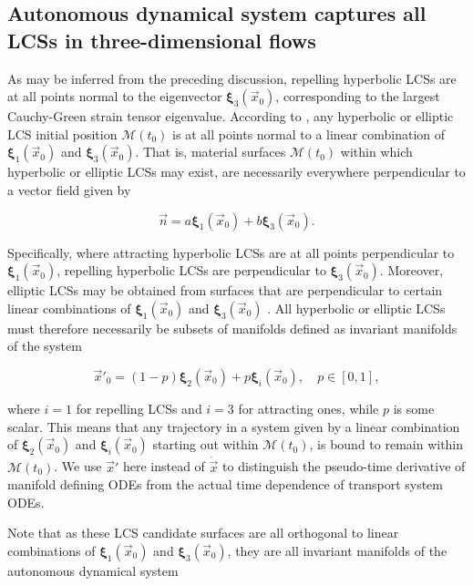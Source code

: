 \subsection{Autonomous dynamical system captures all LCSs in three-dimensional flows}\label{sec:Oettinger}

As may be inferred from the preceding discussion, repelling hyperbolic LCSs are at all points normal to the eigenvector $\bm{\xi}_3(\vec{x}_0)$, corresponding to the largest Cauchy-Green strain tensor eigenvalue. According to \cite{Oettinger}, any hyperbolic or elliptic LCS initial position $\mathcal{M}(t_0)$ is at all points normal to a linear combination of $\bm{\xi}_1(\vec{x}_0)$ and $\bm{\xi}_3(\vec{x}_0)$. That is, material surfaces $\mathcal{M}(t_0)$ within which hyperbolic or elliptic LCSs may exist, are necessarily everywhere perpendicular to a vector field given by

\begin{equation}\label{eq:normal_field}
\vec{n} = a\bm{\xi}_1(\vec{x}_0) + b\bm{\xi}_3(\vec{x}_0).
\end{equation}

\noindent Specifically, where attracting hyperbolic LCSs are at all points perpendicular to $\bm{\xi}_1(\vec{x}_0)$, repelling hyperbolic LCSs are perpendicular to $\bm{\xi}_3(\vec{x}_0)$. Moreover, elliptic LCSs may be obtained from surfaces that are perpendicular to certain linear combinations of $\bm{\xi}_1(\vec{x}_0)$ and $\bm{\xi}_3(\vec{x}_0)$ \citep{Oettinger}. All hyperbolic or elliptic LCSs must therefore necessarily be subsets of manifolds defined as invariant manifolds of the system

\begin{equation}\label{eq:hyperbolic_autonomous_dynamical_system}
\vec{x}'_0=(1-p)\bm{\xi}_2(\vec{x}_0) + p\bm{\xi}_i(\vec{x}_0),\quad p\in[0,1],
\end{equation}

\noindent where $i=1$ for repelling LCSs and $i=3$ for attracting ones, while $p$ is some scalar. This means that any trajectory in a system given by a linear combination of $\bm{\xi}_2(\vec{x}_0)$ and $\bm{\xi}_i(\vec{x}_0)$ starting out within $\mathcal{M}(t_0)$, is bound to remain within $\mathcal{M}(t_0)$. We use $\vec{x}'$ here instead of $\dot{\vec{x}}$ to distinguish the pseudo-time derivative of manifold defining ODEs from the actual time dependence of transport system ODEs.

Note that as these LCS candidate surfaces are all orthogonal to linear combinations of $\bm{\xi}_1(\vec{x}_0)$ and $\bm{\xi}_3(\vec{x}_0)$, they are all invariant manifolds of the autonomous dynamical system

